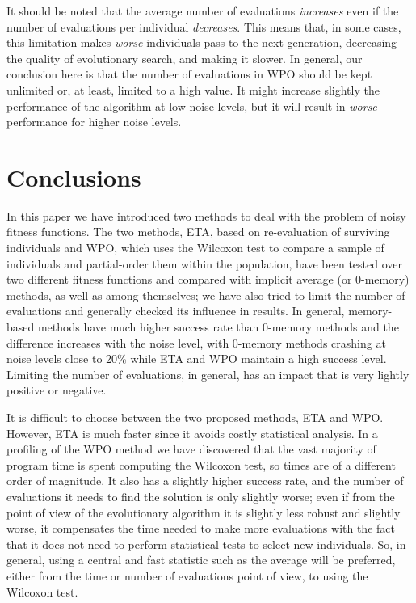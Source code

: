 \documentclass{svmult}
\begin{document}
It should be noted that the average number of evaluations {\em
  increases} even if the number of evaluations per individual {\em
  decreases}. This means that, in some cases, this limitation makes
{\em worse} individuals pass to the next generation, decreasing the
quality of evolutionary search, 
and making it slower. In general, our conclusion
here is that the number of evaluations in WPO should be kept unlimited
or, at least, limited to a high value. It might increase slightly the
performance of the algorithm at low noise levels, but it will result
in {\em worse} performance for higher noise levels. 


\section{Conclusions}

In this paper we have introduced two methods to deal with the problem
of noisy fitness functions. The two methods, {\sf ETA}, based on
re-evaluation of surviving individuals and {\sf WPO}, which uses the
Wilcoxon test to compare a sample of individuals and partial-order
them within the population, 
 have been tested over two
different fitness functions and compared with implicit average (or
0-memory) methods, as well as among themselves; we have also tried to
limit the number of evaluations and generally checked its influence in
results. In general,
memory-based methods have much higher success rate than 0-memory
methods and the difference increases with the noise level, with
0-memory methods crashing at noise levels close to 20\% while ETA and
WPO maintain a high success level. Limiting the number of evaluations,
in general, has an impact that is very lightly positive or
negative. 

It is difficult to choose between the two proposed methods, ETA and
WPO. However, ETA is much faster since it avoids costly
statistical analysis. In a profiling of the WPO method we have
discovered that the vast majority of program time is spent computing
the Wilcoxon test, so times are of a different order of magnitude. 
It also has a slightly higher success rate, and the
number of evaluations it needs to find the solution is only slightly
worse; even if from the point of view of the evolutionary algorithm it
is slightly less robust and slightly worse, it compensates the time
needed to make more evaluations with the fact that it does not need to
perform statistical tests to select new individuals. So, in general,
using a central and fast statistic such as the average will be
preferred, either from the time or number of evaluations point of
view, to using the Wilcoxon test. 
\end{document}
